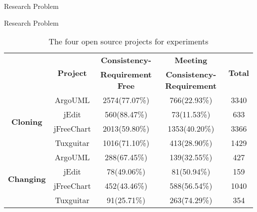 {Research Problem}


{Research Problem}

\begin{table*}[ht]
\caption{The four open source projects for experiments}
\label{allprojects}
\centering
\begin{tabular}{ccccc}
\hline
~\multirow{2}{*}{\textbf{Instances}}&\multirow{2}{*}{\textbf{Project}}&\textbf{Consistency-} &\textbf{Meeting} &\multirow{2}{*}{\textbf{Total}}\\
~&~&\textbf{Requirement Free}&\textbf{Consistency-Requirement}&~\\
\hline
\multirow{4}{*}{\textbf{Cloning}}
&ArgoUML&	2574(77.07\%)&	766(22.93\%)&	3340\\
&jEdit&560(88.47\%)&	73(11.53\%)&	633\\
&jFreeChart&	2013(59.80\%)&	1353(40.20\%)&	3366\\
&Tuxguitar&	1016(71.10\%)&	413(28.90\%)&	1429\\
\hline
\multirow{4}{*}{\textbf{Changing}}
&ArgoUML&288(67.45\%)&139(32.55\%)&427\\
&jEdit&78(49.06\%)&81(50.94\%)&159\\
&jFreeChart&452(43.46\%)&588(56.54\%)&1040\\
&Tuxguitar&91(25.71\%)&263(74.29\%)&354\\
\hline
\end{tabular}
\end{table*}

